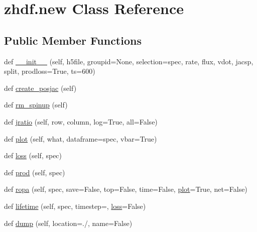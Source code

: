 \hypertarget{classzhdf_1_1new}{}\section{zhdf.\+new Class Reference}
\label{classzhdf_1_1new}
\subsection*{Public Member Functions}
\begin{DoxyCompactItemize}
\item 
def \mbox{\hyperlink{classzhdf_1_1new_ad4b6f20af51813b7692060ba0ec8acbf}{\+\_\+\+\_\+init\+\_\+\+\_\+}} (self, h5file, groupid=None, selection=\textquotesingle{}spec, rate, flux, vdot, jacsp, split, prodloss=True, ts=600)
\item 
def \mbox{\hyperlink{classzhdf_1_1new_ac2f471d2887d2c09c702bb16e06dda73}{create\+\_\+posjac}} (self)
\item 
def \mbox{\hyperlink{classzhdf_1_1new_aae8beafb28be4540cbe8b7b90b9915fb}{rm\+\_\+spinup}} (self)
\item 
def \mbox{\hyperlink{classzhdf_1_1new_a47eb4a577472f59215c79d2785c2588e}{jratio}} (self, row, column, log=True, all=False)
\item 
def \mbox{\hyperlink{classzhdf_1_1new_a9745f192f8c6f7e375a6fada1f44525a}{plot}} (self, what, dataframe=\textquotesingle{}spec\textquotesingle{}, vbar=True)
\item 
def \mbox{\hyperlink{classzhdf_1_1new_af05896dbaac383f107e46d76287d0ea0}{loss}} (self, spec)
\item 
def \mbox{\hyperlink{classzhdf_1_1new_a7e698f744d38ec1a6a308a21fafa63e5}{prod}} (self, spec)
\item 
def \mbox{\hyperlink{classzhdf_1_1new_aad68ddbb6791ca56a8495047091ccd72}{ropa}} (self, spec, save=False, top=False, time=False, \mbox{\hyperlink{classzhdf_1_1new_a9745f192f8c6f7e375a6fada1f44525a}{plot}}=True, net=False)
\item 
def \mbox{\hyperlink{classzhdf_1_1new_aa7d832d1f91a699ea51a319ac87e2a84}{lifetime}} (self, spec, timestep=\textquotesingle{}\textquotesingle{}, \mbox{\hyperlink{classzhdf_1_1new_af05896dbaac383f107e46d76287d0ea0}{loss}}=False)
\item 
def \mbox{\hyperlink{classzhdf_1_1new_a87ee987ac4b5f4fea8cc03cd78744f81}{dump}} (self, location=\textquotesingle{}./\textquotesingle{}, name=False)
\item 
\mbox{\label{classzhdf_1_1new_af986fe148abafe984e302e3b6e419e42}} 

\end{DoxyCompactItemize}

